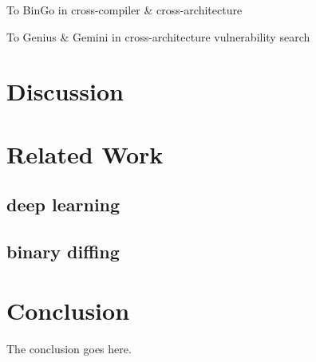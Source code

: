 \documentclass[10pt,conference]{IEEEtran}
\begin{document}
\par To BinGo in cross-compiler \& cross-architecture

\par To Genius \& Gemini in cross-architecture vulnerability search





\section{Discussion}

\section{Related Work}

\subsection{deep learning}

\subsection{binary diffing}



\section{Conclusion}
The conclusion goes here.






\end{document}
